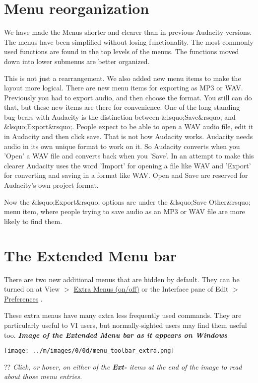 \documentclass[]{book}
\begin{document}
\begin{multicols}{2}

\section{Menu reorganization}


We have made the Menus shorter and clearer than in previous Audacity versions. The menus have been simplified without losing functionality. The most commonly used functions are found in the top levels of the menus. The functions moved down into lower submenus are better organized.

This is not just a rearrangement.  We also added new menu items to make the layout more logical.  There are new menu items for exporting as MP3 or WAV. Previously you had to export audio, and then choose the format. You still can do that, but these new items are there for convenience.
One of the long standing bug-bears with Audacity is the distinction between \&lsquo;Save\&rsquo; and \&lsquo;Export\&rsquo;. People expect to be able to open a WAV audio file, edit it in Audacity and then click save. That is not how Audacity works. Audacity needs audio in its own unique format to work on it. So Audacity converts when you 'Open' a WAV file and converts back when you 'Save'. In an attempt to make this clearer Audacity uses the word 'Import' for opening a file like WAV and 'Export' for converting and saving in a format like WAV. Open and Save are reserved for Audacity's own project format.

Now the \&lsquo;Export\&rsquo; options are under the \&lsquo;Save Other\&rsquo; menu item, where people trying to save audio as an MP3 or WAV file are more likely to find them. 



\section{The Extended Menu bar}


There are two new additional menus that are hidden by default.  They can be turned on at View \mbox{$>$} 
\hyperref[view_menu__extra_menus_onoff]{Extra Menus (on/off)}
 or the Interface pane of Edit \mbox{$>$} 
\hyperref[interface_preferences_]{Preferences}
.

These extra menus have many extra less frequently used commands.  They are particularly useful to VI users, but normally-sighted users may find them useful too.
\textit{\textbf{Image of the Extended Menu bar as it appears on Windows}}\par\texttt{[image: ../m/images/0/0d/menu\_toolbar\_extra.png]}\par??
\textit{Click, or hover, on either of the \textbf{Ext-} items at the end of the image to read about those menu entries.}


\end{multicols}
\end{document}
